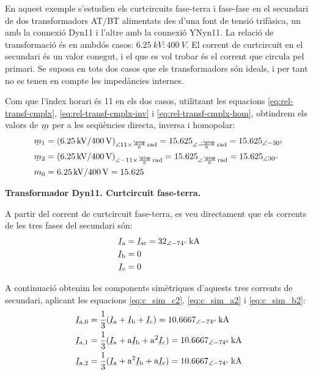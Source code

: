 \begin{exemple}
    En aquest exemple s'estudien els curtcircuits fase-terra i fase-fase en el secundari de dos transformadors AT/BT alimentats des d'una font de tensió trifàsica, un amb la connexió Dyn11 i l'altre amb la connexió YNyn11. La relació de transformació és en ambdós casos: $\qty{6,25}{kV}\!:\!\qty{400}{V}$. El corrent de curtcircuit en el secundari és un valor conegut, i el que es vol trobar és el corrent que circula pel primari. Se suposa en tots dos casos que els transformadors són ideals, i per tant no es tenen en compte les impedàncies internes.


    Com que l'índex horari és 11 en els dos casos, utilitzant les equacions \eqref{eq:rel-transf-cmplx}, \eqref{eq:rel-transf-cmplx-inv} i \eqref{eq:rel-transf-cmplx-hom}, obtindrem els valors de $\cmplx{m}$ per a les seqüències directa, inversa i homopolar:
    \begin{align*}
        \cmplx{m}_1 &= (\qty{6,25}{kV} / \qty{400}{V})_{\angle 11\times\frac{\piup}{6}\unit{\,rad}} =
        \num{15,625}_{\angle \frac{-\piup}{6}\unit{\,rad}} = \numpd{15,625}{-30} \\
        \cmplx{m}_2 &= (\qty{6,25}{kV} / \qty{400}{V})_{\angle -11\times\frac{\piup}{6}\unit{\,rad}} =
        \num{15,625}_{\angle \frac{\piup}{6}\unit{\,rad}} =\numpd{15,625}{30}  \\
        m_0 &= \qty{6,25}{kV} / \qty{400}{V} = \num{15,625}
    \end{align*}

   \textbf{ Transformador Dyn11. Curtcircuit fase-terra.}

    \begin{center}
       
    \end{center}

    A partir del corrent de curtcircuit fase-terra, es veu directament que els corrents de les tres fases del secundari són:
    \begin{align*}
        \cmplx{I}\ped{a} &= \cmplx{I}\ped{sc} = \qtypd{32}{-74}{kA} \\
        \cmplx{I}\ped{b} &= 0  \\
        \cmplx{I}\ped{c} &= 0
    \end{align*}

    A continuació obtenim les components simètriques d'aquests tres corrents de secundari, aplicant les equacions \eqref{eq:c_sim_c2}, \eqref{eq:c_sim_a2} i \eqref{eq:c_sim_b2}:
    \begin{align*}
        \cmplx{I}\ped{a,0} &= \frac{1}{3} (\cmplx{I}\ped{a} + \cmplx{I}\ped{b} +
        \cmplx{I}\ped{c}) = \qtypd{10,6667}{-74}{kA} \\
        \cmplx{I}\ped{a,1} &= \frac{1}{3} (\cmplx{I}\ped{a} + \au \cmplx{I}\ped{b} +
         \au^2 \cmplx{I}\ped{c}) = \qtypd{10,6667}{-74}{kA}  \\
        \cmplx{I}\ped{a,2} &= \frac{1}{3} (\cmplx{I}\ped{a} + \au^2 \cmplx{I}\ped{b} +
         \au \cmplx{I}\ped{c}) = \qtypd{10,6667}{-74}{kA}
    \end{align*}


\end{exemple}
